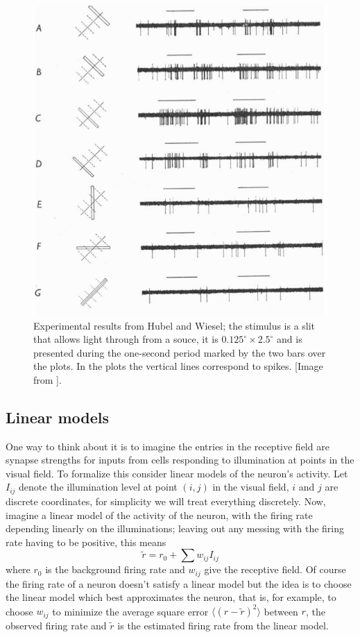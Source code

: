 \documentclass[11pt,a4paper]{scrartcl}
\begin{document}
\begin{figure}
\begin{center}
\includegraphics[width=12cm]{HW.png}
\end{center}
\caption{Experimental results from Hubel and Wiesel; the stimulus is a slit that allows light through from a souce, it is $0.125^\circ\times 2.5^\circ$ and is presented during the one-second period marked by the two bars over the plots. In the plots the vertical lines correspond to spikes. [Image from \cite{HubelWiesel1962a}].\label{fig:hw}}
\end{figure}

\subsection*{Linear models}


One way to think about it is to imagine the entries in the receptive
field are synapse strengths for inputs from cells responding to
illumination at points in the visual field. To formalize this consider
linear models of the neuron's activity. Let $I_{ij}$ denote the
illumination level at point $(i,j)$ in the visual field, $i$ and $j$
are discrete coordinates, for simplicity we will treat everything
discretely. Now, imagine a linear model of the activity of the neuron,
with the firing rate depending linearly on the illuminations; leaving
out any messing with the firing rate having to be positive, this means
\begin{equation}
\tilde{r}=r_0+\sum w_{ij}I_{ij}
\end{equation}
where $r_0$ is the background firing rate and $w_{ij}$ give the
receptive field. Of course the firing rate of a neuron doesn't satisfy
a linear model but the idea is to choose the linear model which best
approximates the neuron, that is, for example, to choose $w_{ij}$ to
minimize the average square error $\langle (r-\tilde{r})^2\rangle$
between $r$, the observed firing rate and $\tilde{r}$ is the estimated
firing rate from the linear model.
\end{document}
